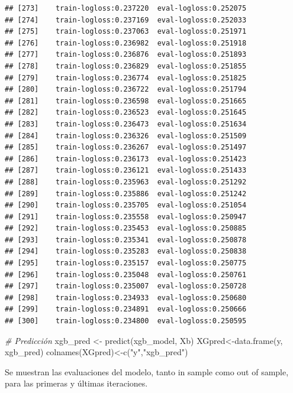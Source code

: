 \documentclass[
]{article}
\newenvironment{Shaded}{\begin{snugshade}}{\end{snugshade}}
\newcommand{\CommentTok}[1]{\textcolor[rgb]{0.56,0.35,0.01}{\textit{#1}}}
\newcommand{\FunctionTok}[1]{\textcolor[rgb]{0.00,0.00,0.00}{#1}}
\newcommand{\NormalTok}[1]{#1}
\newcommand{\OtherTok}[1]{\textcolor[rgb]{0.56,0.35,0.01}{#1}}
\newcommand{\SpecialCharTok}[1]{\textcolor[rgb]{0.00,0.00,0.00}{#1}}
\newcommand{\StringTok}[1]{\textcolor[rgb]{0.31,0.60,0.02}{#1}}
\begin{document}
\begin{verbatim}
## [273]    train-logloss:0.237220  eval-logloss:0.252075 
## [274]    train-logloss:0.237169  eval-logloss:0.252033 
## [275]    train-logloss:0.237063  eval-logloss:0.251971 
## [276]    train-logloss:0.236982  eval-logloss:0.251918 
## [277]    train-logloss:0.236876  eval-logloss:0.251893 
## [278]    train-logloss:0.236829  eval-logloss:0.251855 
## [279]    train-logloss:0.236774  eval-logloss:0.251825 
## [280]    train-logloss:0.236722  eval-logloss:0.251794 
## [281]    train-logloss:0.236598  eval-logloss:0.251665 
## [282]    train-logloss:0.236523  eval-logloss:0.251645 
## [283]    train-logloss:0.236473  eval-logloss:0.251634 
## [284]    train-logloss:0.236326  eval-logloss:0.251509 
## [285]    train-logloss:0.236267  eval-logloss:0.251497 
## [286]    train-logloss:0.236173  eval-logloss:0.251423 
## [287]    train-logloss:0.236121  eval-logloss:0.251433 
## [288]    train-logloss:0.235963  eval-logloss:0.251292 
## [289]    train-logloss:0.235886  eval-logloss:0.251242 
## [290]    train-logloss:0.235705  eval-logloss:0.251054 
## [291]    train-logloss:0.235558  eval-logloss:0.250947 
## [292]    train-logloss:0.235453  eval-logloss:0.250885 
## [293]    train-logloss:0.235341  eval-logloss:0.250878 
## [294]    train-logloss:0.235283  eval-logloss:0.250838 
## [295]    train-logloss:0.235157  eval-logloss:0.250775 
## [296]    train-logloss:0.235048  eval-logloss:0.250761 
## [297]    train-logloss:0.235007  eval-logloss:0.250728 
## [298]    train-logloss:0.234933  eval-logloss:0.250680 
## [299]    train-logloss:0.234891  eval-logloss:0.250666 
## [300]    train-logloss:0.234800  eval-logloss:0.250595
\end{verbatim}

\begin{Shaded}
\begin{Highlighting}[]
\CommentTok{\# Predicción}
\NormalTok{xgb\_pred }\OtherTok{\textless{}{-}} \FunctionTok{predict}\NormalTok{(xgb\_model, Xb)}
\NormalTok{XGpred}\OtherTok{\textless{}{-}}\FunctionTok{data.frame}\NormalTok{(y, xgb\_pred)}
\FunctionTok{colnames}\NormalTok{(XGpred)}\OtherTok{\textless{}{-}}\FunctionTok{c}\NormalTok{(}\StringTok{"y"}\NormalTok{,}\StringTok{"xgb\_pred"}\NormalTok{)}
\end{Highlighting}
\end{Shaded}

Se muestran las evaluaciones del modelo, tanto in sample como out of
sample, para las primeras y últimas iteraciones.

\begin{Shaded}
\end{Shaded}
\end{document}
